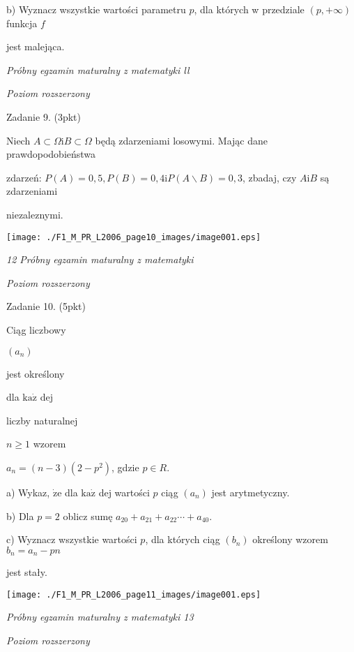 \documentclass[a4paper,12pt]{article}
\begin{document}
b) Wyznacz wszystkie wartości parametru $p$, dla których w przedziale $(p,+\infty)$ funkcja $f$

jest malejąca.





{\it Próbny egzamin maturalny z matematyki ll}

{\it Poziom rozszerzony}

Zadanie 9. (3pkt)

Niech $ A\subset\Omega \mathrm{i}  B\subset\Omega$ będą zdarzeniami losowymi. Mając dane prawdopodobieństwa

zdarzeń: $P(A)=0,5, P(B)=0,4 \mathrm{i} P(A\backslash B)=0,3$, zbadaj, czy $A \mathrm{i} B$ są zdarzeniami

niezaleznymi.
\begin{center}
\texttt{[image: ./F1\_M\_PR\_L2006\_page10\_images/image001.eps]}
\end{center}




{\it 12 Próbny egzamin maturalny z matematyki}

{\it Poziom rozszerzony}

Zadanie 10. (5pkt)

Ciąg liczbowy

$(a_{n})$

jest określony

dla $\mathrm{k}\mathrm{a}\dot{\mathrm{z}}$ dej

liczby naturalnej

$n\geq 1$ wzorem

$a_{n}=(n-3)(2-p^{2})$, gdzie $p\in R.$

a) Wykaz, $\dot{\mathrm{z}}\mathrm{e}$ dla $\mathrm{k}\mathrm{a}\dot{\mathrm{z}}$ dej wartości $p$ ciąg $(a_{n})$ jest arytmetyczny.

b) Dla $p=2$ oblicz sumę $a_{20}+a_{21}+a_{22}\cdots+a_{40}.$

c) Wyznacz wszystkie wartości $p$, dla których ciąg $(b_{n})$ określony wzorem $b_{n}=a_{n}-pn$

jest stały.
\begin{center}
\texttt{[image: ./F1\_M\_PR\_L2006\_page11\_images/image001.eps]}
\end{center}




{\it Próbny egzamin maturalny z matematyki 13}

{\it Poziom rozszerzony}
\end{document}
